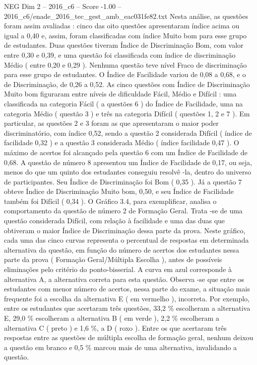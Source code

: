 \begin{textsample}{NEG Dim 2 – 2016\_c6 – Score -1.00 – 2016\_c6/enade\_2016\_tec\_gest\_amb\_eac031fe82.txt}
Nesta análise, as questões foram assim avaliadas : cinco das oito questões apresentaram índice acima ou igual a 0,40 e, assim, foram classificadas com índice Muito bom para esse grupo de estudantes.
Duas questões tiveram Índice de Discriminação Bom, com valor entre 0,30 e 0,39, e uma questão foi classificada com índice de discriminação Médio ( entre 0,20 e 0,29 ).
Nenhuma questão teve nível Fraco de discriminação para esse grupo de estudantes.
O Índice de Facilidade variou de 0,08 a 0,68, e o de Discriminação, de 0,26 a 0,52.
As cinco questões com Índice de Discriminação Muito bom figuraram entre níveis de dificuldade Fácil, Médio e Difícil : uma classificada na categoria Fácil ( a questões 6 ) do Índice de Facilidade, uma na categoria Médio ( questão 3 ) e três na categoria Difícil ( questões 1, 2 e 7 ).
Em particular, as questões 2 e 3 foram as que apresentaram o maior poder discriminatório, com índice 0,52, sendo a questão 2 considerada Difícil ( índice de facilidade 0,32 ) e a questão 3 considerada Médio ( índice facilidade 0,47 ).
O máximo de acertos foi alcançado pela questão 6 com um Índice de Facilidade de 0,68.
A questão de número 8 apresentou um Índice de Facilidade de 0,17, ou seja, menos do que um quinto dos estudantes conseguiu resolvê -la, dentro do universo de participantes.
Seu Índice de Discriminação foi Bom ( 0,35 ).
Já a questão 7 obteve Índice de Discriminação Muito bom, 0,50, e seu Índice de Facilidade também foi Difícil ( 0,34 ).
O Gráfico 3.4, para exemplificar, analisa o comportamento da questão de número 2 de Formação Geral.
Trata -se de uma questão considerada Difícil, com relação à facilidade e uma das duas que obtiveram o maior Índice de Discriminação dessa parte da prova.
Neste gráfico, cada uma das cinco curvas representa o percentual de respostas em determinada alternativa da questão, em função do número de acertos dos estudantes nessa parte da prova ( Formação Geral/Múltipla Escolha ), antes de possíveis eliminações pelo critério do ponto-bisserial.
A curva em azul corresponde à alternativa A, a alternativa correta para esta questão.
Observa -se que entre os estudantes com menor número de acertos, nessa parte do exame, a situação mais frequente foi a escolha da alternativa E ( em vermelho ), incorreta.
Por exemplo, entre os estudantes que acertaram três questões, 33,2 \% escolheram a alternativa E, 29,0 \% escolheram a alternativa B ( em verde ), 2,2 \% escolheram a alternativa C ( preto ) e 1,6 \%, a D ( roxo ).
Entre os que acertaram três respostas entre as questões de múltipla escolha de formação geral, nenhum deixou a questão em branco e 0,5 \% marcou mais de uma alternativa, invalidando a questão.

\end{textsample}
